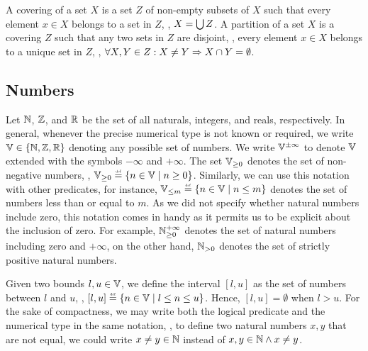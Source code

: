 A covering of a set $X$ is a set $Z$ of non-empty subsets of $X$ such that every element $x \in X$ belongs to a set in $Z$, \ie, $X = \bigcup Z$. A partition of a set $X$ is a covering $Z$ such that any two sets in $Z$ are disjoint, \ie, every element $x \in X$ belongs to a unique set in $Z$, \ie, $\forall X, Y \in Z : X \neq Y \Rightarrow X \cap Y = \emptyset$.


\subsection{Numbers}

Let $\mathbb{N}$, $\mathbb{Z}$, and $\mathbb{R}$ be the set of all naturals, integers, and reals, respectively.
In general, whenever the precise numerical type is not known or required, we write $\mathbb{V}\in\{\mathbb{N}, \mathbb{Z}, \mathbb{R}\}$ denoting any possible set of numbers.
We write $\mathbb{V}^{\pm \infty}$ to denote $\mathbb{V}$ extended with the symbols $-\infty$ and $+\infty$.
The set $\mathbb{V}_{\ge 0}$ denotes the set of non-negative numbers, \ie, $\values_{\ge 0} \defeq \setdef{n \in \values}{n \geq 0}$.
Similarly, we can use this notation with other predicates, for instance, $\values_{\le m} \defeq \setdef{n \in \values}{n \le m}$ denotes the set of numbers less than or equal to $m$.
As we did not specify whether natural numbers include zero, this notation comes in handy as it permits us to be explicit about the inclusion of zero.
For example, $\mathbb{N}_{\ge 0}^{+\infty}$ denotes the set of natural numbers including zero and $+\infty$, on the other hand, $\mathbb{N}_{> 0}$ denotes the set of strictly positive natural numbers.

Given two bounds $l, u \in \mathbb{V}$, we define the interval $[l, u]$ as the set of numbers between $l$ and $u$, \ie, $[l, u] \defeq \setdef{n \in \values}{l \le n \le u}$. Hence, $[l, u] = \emptyset$ when $l > u$.
For the sake of compactness, we may write both the logical predicate and the numerical type in the same notation, \eg, to define two natural numbers $x, y$ that are not equal, we could write $x \neq y \in \mathbb{N}$ instead of $x, y \in \mathbb{N} \land x \neq y$.


